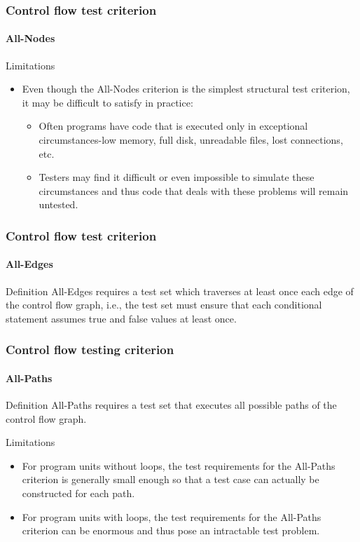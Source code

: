 \begin{frame}
\frametitle{Control flow test criterion}
\framesubtitle{All-Nodes}

\begin{block:fact}{Limitations}
\begin{itemize}
	\item Even though the All-Nodes criterion is the simplest structural test
	criterion, it may be difficult to satisfy in practice:
	\begin{itemize}
		\item Often programs have code that is executed only in exceptional
		circumstances-low memory, full disk, unreadable files, lost
		connections, etc.

		\item Testers may find it difficult or even impossible to simulate
		these circumstances and thus code that deals with these problems will
		remain untested.
	\end{itemize}
\end{itemize}
\end{block:fact}
\end{frame}



\begin{frame}
\label{concept:all-edges-criterion}
\label{concept:all-edges}
\frametitle{Control flow test criterion}
\framesubtitle{All-Edges}


\begin{block:concept}{Definition}
All-Edges requires a test set which traverses at least once each edge
of the control flow graph, i.e., the test set must ensure that each
conditional statement assumes true and false values at least once.
\end{block:concept}
\end{frame}


\begin{frame}
\frametitle{Control flow testing criterion}
\framesubtitle{All-Paths}
\label{concept:all-paths-criterion}
\label{concept:all-paths}

\begin{block:concept}{Definition}
All-Paths requires a test set that executes all possible paths of the control
flow graph.
\end{block:concept}

\begin{block:fact}{Limitations}
\begin{itemize}
	\item For program units without loops, the test requirements for the
	All-Paths criterion is generally small enough so that a test case can
	actually be constructed for each path.

	\item For program units with loops, the test requirements for the All-Paths
	criterion can be enormous and thus pose an intractable test problem.
\end{itemize}
\end{block:fact}
\end{frame}
